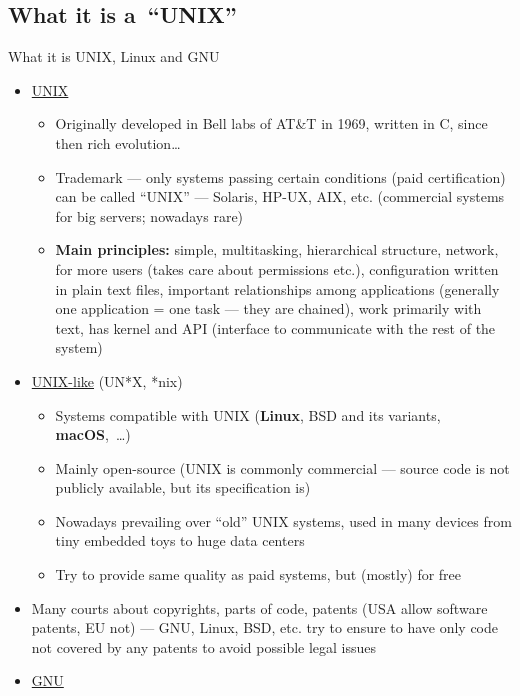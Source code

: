 \documentclass[compress, xelatex, 11pt, xcolor=svgnames, aspectratio=169,
	hyperref={
		bookmarks=true,
		unicode=true,
		colorlinks=true,
		pdftitle={Linux, command line and MetaCentrum},
		plainpages=false,
		pdfauthor={Vojtech Zeisek},
		pdfsubject={Course about use of Linux command line, writing shell scripts and using MetaCentrum of CESNET},
		pdfcreator={XeLaTeX},
		pdfkeywords={Linux, GNU, BASH, shell, command line, MetaCentrum},
		linkcolor=DarkRed, %
		anchorcolor=DarkBlue, %
		citecolor=Indigo, %
		filecolor=NavyBlue, %
		menucolor=DarkMagenta, %
		urlcolor=DarkBlue, %
		},
	url={hyphens, lowtilde} %
	]{beamer}
\begin{document}
\subsection{What it is a~\enquote{UNIX}}

\begin{frame}[allowframebreaks]{What it is UNIX, Linux and GNU}
	\begin{itemize}
		\item \href{https://en.wikipedia.org/wiki/Unix}{UNIX}
		\begin{itemize}
			\item Originally developed in Bell labs of AT\&T in 1969, written in C, since then rich evolution\ldots
			\item Trademark --- only systems passing certain conditions (paid certification) can be called \enquote{UNIX} --- Solaris, HP-UX, AIX, etc. (commercial systems for big servers; nowadays rare)
			\item \textbf{Main principles:} simple, multitasking, hierarchical structure, network, for more users (takes care about permissions etc.), configuration written in plain text files, important relationships among applications (generally one application = one task --- they are chained), work primarily with text, has kernel and API (interface to communicate with the rest of the system)
		\end{itemize}
		\item \href{https://en.wikipedia.org/wiki/Unix-like}{UNIX-like} (UN*X, *nix)
		\begin{itemize}
			\item Systems compatible with UNIX (\textbf{Linux}, BSD and its variants, \textbf{macOS},~\ldots)
			\item Mainly open-source (UNIX is commonly commercial --- source code is not publicly available, but its specification is)
			\item Nowadays prevailing over \enquote{old} UNIX systems, used in many devices from tiny embedded toys to huge data centers
			\item Try to provide same quality as paid systems, but (mostly) for free
		\end{itemize}
		\item Many courts about copyrights, parts of code, patents (USA allow software patents, EU not) --- GNU, Linux, BSD, etc. try to ensure to have only code not covered by any patents to avoid possible legal issues
		\item \href{https://www.gnu.org/}{GNU}
		\begin{itemize}

\end{itemize}
\end{itemize}
\end{frame}
\end{document}
